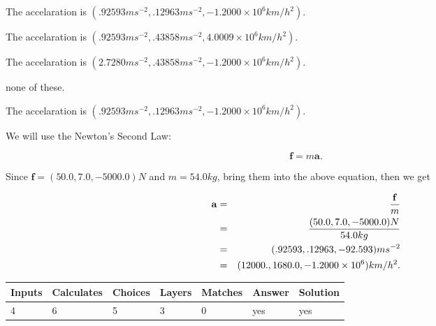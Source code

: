 \documentclass[12pt]{article}
\begin{document}
 
The accelaration is
$(
.92593ms^{-2},
.12963ms^{-2},
-1.2000 \times 10^{6}km/h^2
).
$
 
 
The accelaration is
$(
.92593ms^{-2},
.43858ms^{-2},
4.0009 \times 10^{6}km/h^2
).
$
 
 
The accelaration is
$(
2.7280ms^{-2},
.43858ms^{-2},
-1.2000 \times 10^{6}km/h^2
).
$
 
 
none of these.
 
 
\noindent{}
 
 
The accelaration is
$(
.92593ms^{-2},
.12963ms^{-2},
-1.2000 \times 10^{6}km/h^2
).
$
 
 
\noindent{}
 
 
 
 
 
 
\noindent{}
 
 

We will use the Newton's Second Law:
 
\[
\mathbf{f}=m\mathbf{a}.
\]
 
Since $\mathbf{f}=( %
50.0,  %
7.0,  %
-5000.0 )N$
and $m= %
54.0kg$, bring them into the above equation, then we get
 
\begin{eqnarray*}
\mathbf{a}&=&\frac{\mathbf{f}}m  \\
&=&\frac{(
50.0 ,
7.0 ,
-5000.0 )N
}{ %
54.0 kg}  \\
&=&(
.92593 ,
.12963,
-92.593
)ms^{-2} \\
&=&(
12000. ,
1680.0 ,
-1.2000 \times 10^{6}
)km/h^2.
\end{eqnarray*}
 
 
 
\noindent{}
 
 

 
\vspace{0.3in}
   
   
   
   
\noindent\begin{tabular}{|l|l|l|l|l|l|l|}
 \hline
Inputs & Calculates & Choices & Layers & Matches & Answer & Solution \\ \hline
           4 & 
           6 & 
           5
  & 
           3 & 
           0 & 
  yes & 
  yes 
  \\ \hline
 \end{tabular}
   
\end{document}
